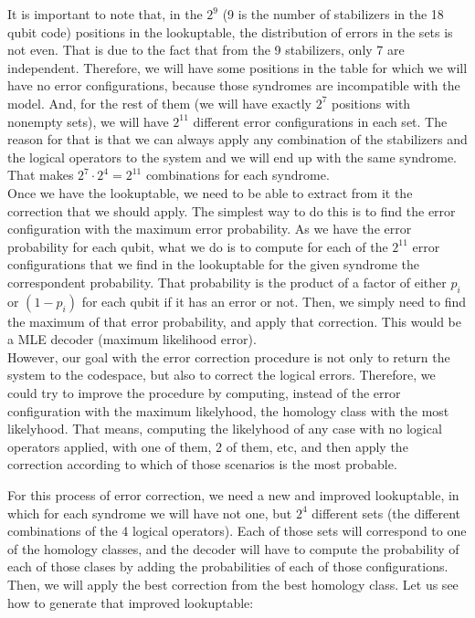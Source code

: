 \documentclass[a4paper,12pt]{article}
\begin{document}
It is important to note that, in the $2^9$ (9 is the number of stabilizers in the 18 qubit code) positions in the lookuptable, the distribution of errors in the sets is not even. That is due to the fact that from the 9 stabilizers, only 7 are independent.  Therefore, we will have some positions in the table for which we will have no error configurations, because those syndromes are incompatible with the model. And, for the rest of them (we will have exactly $2^7$ positions with nonempty sets), we will have $2^11$ different error configurations in each set. The reason for that is that we can always apply any combination of the stabilizers and the logical operators to the system and we will end up with the same syndrome. That makes $2^7\cdot 2^4=2^11$ combinations for each syndrome.\\

Once we have the lookuptable, we need to be able to extract from it the correction that we should apply. The simplest way to do this is to find the error configuration with the maximum error probability. As we have the error probability for each qubit, what we do is to compute for each of the $2^11$ error configurations that we find in the lookuptable for the given syndrome the correspondent probability. That probability is the product of a factor of either $p_i$ or $(1-p_i)$ for each qubit if it has an error or not. Then, we simply need to find the maximum of that error probability, and apply that correction. This would be a MLE decoder (maximum likelihood error).\\

However, our goal with the error correction procedure is not only to return the system to the codespace, but also to correct the logical errors. Therefore, we could try to improve the procedure by computing, instead of the error configuration with the maximum likelyhood, the homology class with the most likelyhood. That means, computing the likelyhood of any case with no logical operators applied, with one of them, 2 of them, etc, and then apply the correction according to which of those scenarios is the most probable.

For this process of error correction, we need a new and improved lookuptable, in which for each syndrome we will have not one, but $2^4$ different sets (the different combinations of the 4 logical operators). Each of those sets will correspond to one of the homology classes, and the decoder will have to compute the probability of each of those clases by adding the probabilities of each of those configurations. Then, we will apply the best correction from the best homology class. Let us see how to generate that improved lookuptable:
\end{document}
